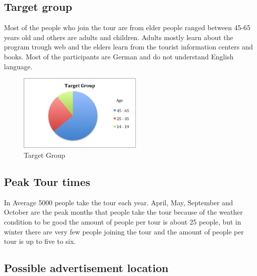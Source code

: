 \subsection{Target group}

Most of the people who join the tour are from elder people ranged between 45-65 years old and others are adults and children. Adults mostly learn about the program trough web and the elders learn from the tourist information centers and books.  Most of the participants are German and do not understand English language.

\begin{figure}[H]
    \centering
    \includegraphics[width=6cm]{Figures/4/target_group}%
    \caption{Target Group}%
    \label{fig:target_group}%
\end{figure}


\subsection{Peak Tour times}
In Average 5000 people take the tour each year. April, May, September and October are the peak months that people take the tour because of the weather condition to be good the amount of people per tour is about 25 people, but in winter there are very few people joining the tour and the amount of people per tour is up to five to six. 

\subsection{Possible advertisement location}

